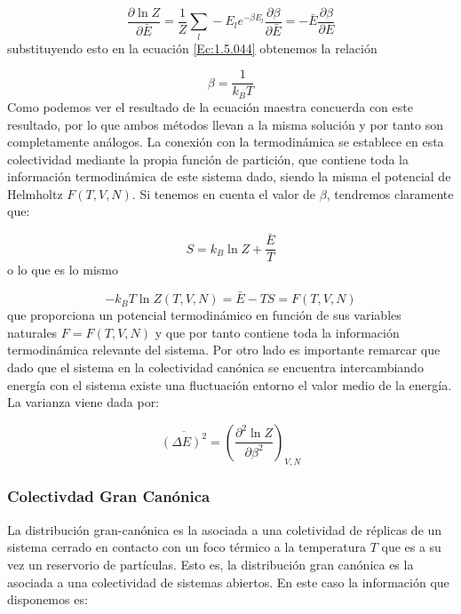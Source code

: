 \documentclass[12pt,a4paper]{article}
\numberwithin{equation}{section}
\numberwithin{figure}{section}
\newcommand{\parentesis}[1]{\left( #1  \right)}
\newcommand{\parciales}[2]{\frac{\partial #1}{\partial #2}}
\theoremstyle{definition}
\begin{document}
\begin{equation}
\parciales{\ln Z}{\bar{E}} = \frac{1}{Z} \sum_l -  E_l e^{-\beta E_l} \parciales{\beta}{\bar{E}} = - \bar{E} \parciales{\beta}{E}
\end{equation}
substituyendo esto en la ecuación \ref{Ec:1.5.044} obtenemos la relación

\begin{equation}
\beta = \frac{1}{k_B T}
\end{equation}
Como podemos ver el resultado de la ecuación maestra concuerda con este resultado, por lo que ambos métodos llevan a la misma solución y por tanto son completamente análogos. La conexión con la termodinámica se establece en esta colectividad mediante la propia función de partición, que contiene toda la información termodinámica de este sistema dado, siendo la misma el potencial de Helmholtz $F(T,V,N)$. Si tenemos en cuenta el valor de $\beta$, tendremos claramente que:

\begin{equation}
S = k_B \ln Z + \frac{\bar{E}}{T} \label{Ec:1.5.047}
\end{equation}
o lo que es lo mismo

\begin{equation}
- k_B T \ln Z (T,V,N) = \bar{E} - T S = F(T,V,N)
\end{equation}
que proporciona un potencial termodinámico en función de sus variables naturales $F=F(T,V,N)$ y que por tanto contiene toda la información termodinámica relevante del sistema. Por otro lado es importante remarcar que dado que el sistema en la colectividad canónica se encuentra intercambiando energía con el sistema existe una fluctuación entorno el valor medio de la energía. La varianza viene dada por:

\begin{equation}
\overline{(\Delta E)^2} = \parentesis{\parciales{^2 \ln Z}{\beta^2}}_{V,N}
\end{equation}

\subsubsection{Colectivdad Gran Canónica}
La distribución gran-canónica es la asociada a una coletividad de réplicas de un sistema cerrado en contacto con un foco térmico a la temperatura $T$ que es a su vez un reservorio de partículas. Esto es, la distribución gran canónica es la asociada a una colectividad de sistemas abiertos. En este caso la información que disponemos es:
\end{document}

